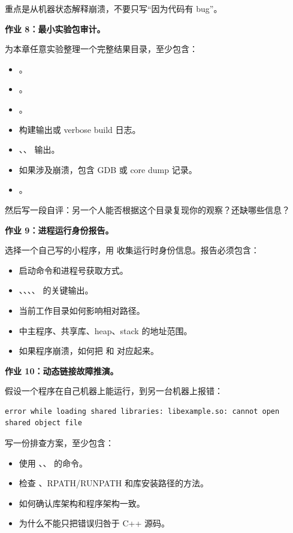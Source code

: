 \begin{exercisebox}
重点是从机器状态解释崩溃，不要只写“因为代码有 bug”。

\textbf{作业 8：最小实验包审计。}

为本章任意实验整理一个完整结果目录，至少包含：

\begin{itemize}
  \item {}。
  \item {}。
  \item {}。
  \item 构建输出或 verbose build 日志。
  \item {}、、 输出。
  \item 如果涉及崩溃，包含 GDB 或 core dump 记录。
  \item {}。
\end{itemize}

然后写一段自评：另一个人能否根据这个目录复现你的观察？还缺哪些信息？

\textbf{作业 9：进程运行身份报告。}

选择一个自己写的小程序，用  收集运行时身份信息。报告必须包含：

\begin{itemize}
  \item 启动命令和进程号获取方式。
  \item {}、、、、 的关键输出。
  \item 当前工作目录如何影响相对路径。
  \item {} 中主程序、共享库、heap、stack 的地址范围。
  \item 如果程序崩溃，如何把  和  对应起来。
\end{itemize}

\textbf{作业 10：动态链接故障推演。}

假设一个程序在自己机器上能运行，到另一台机器上报错：

\begin{lstlisting}
error while loading shared libraries: libexample.so: cannot open shared object file
\end{lstlisting}

写一份排查方案，至少包含：

\begin{itemize}
  \item 使用 、、 的命令。
  \item 检查 、RPATH/RUNPATH 和库安装路径的方法。
  \item 如何确认库架构和程序架构一致。
  \item 为什么不能只把错误归咎于 C++ 源码。
\end{itemize}


\end{exercisebox}
